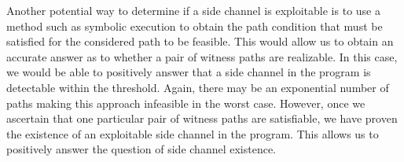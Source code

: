 Another potential way to determine if a side channel is exploitable is to use a method such as symbolic execution \cite{symbolic} to obtain the path condition that must be satisfied for the considered path to be feasible.  This would allow us to obtain an accurate answer as to whether a pair of witness paths are realizable. In this case, we would be able to positively answer that a side channel in the program is detectable within the threshold. Again, there may be an exponential number of paths making this approach infeasible in the worst case. However, once we ascertain that one particular pair of witness paths are satisfiable, we have proven the existence of an exploitable side channel in the program. This allows us to positively answer the question of side channel existence. 